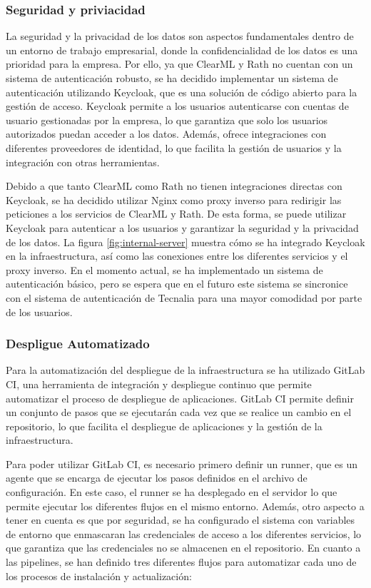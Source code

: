 \subsubsection{Seguridad y priviacidad}
La seguridad y la privacidad de los datos son aspectos fundamentales dentro
de un entorno de trabajo empresarial, donde la confidencialidad de los datos
es una prioridad para la empresa. Por ello, ya que ClearML y Rath no cuentan
con un sistema de autenticación robusto, se ha decidido implementar un sistema
de autenticación utilizando Keycloak, que es una solución de código abierto
para la gestión de acceso. Keycloak permite a los usuarios autenticarse con
cuentas de usuario gestionadas por la empresa, lo que garantiza que solo los
usuarios autorizados puedan acceder a los datos. Además, ofrece integraciones
con diferentes proveedores de identidad, lo que facilita la gestión de
usuarios y la integración con otras herramientas.\medskip

Debido a que tanto ClearML como Rath no tienen integraciones directas con
Keycloak, se ha decidido utilizar Nginx como proxy inverso para redirigir
las peticiones a los servicios de ClearML y Rath. De esta forma, se puede
utilizar Keycloak para autenticar a los usuarios y garantizar la seguridad
y la privacidad de los datos. La figura \ref{fig:internal-server} muestra
cómo se ha integrado Keycloak en la infraestructura, así como las conexiones
entre los diferentes servicios y el proxy inverso. En el momento actual, se
ha implementado un sistema de autenticación básico, pero se espera que en el
futuro este sistema se sincronice con el sistema de autenticación de Tecnalia
para una mayor comodidad por parte de los usuarios.

\subsubsection{Despligue Automatizado}
Para la automatización del despliegue de la infraestructura se ha utilizado
GitLab CI, una herramienta de integración y despliegue continuo que
permite automatizar el proceso de despliegue de aplicaciones. GitLab CI
permite definir un conjunto de pasos que se ejecutarán cada vez que se
realice un cambio en el repositorio, lo que facilita el despliegue de
aplicaciones y la gestión de la infraestructura.\medskip

Para poder utilizar GitLab CI, es necesario primero definir un runner, que
es un agente que se encarga de ejecutar los pasos definidos en el archivo
de configuración. En este caso, el runner se ha desplegado en el servidor
lo que permite ejecutar los diferentes flujos en el mismo entorno. Además,
otro aspecto a tener en cuenta es que por seguridad, se ha configurado el
sistema con variables de entorno que enmascaran las credenciales de acceso
a los diferentes servicios, lo que garantiza que las credenciales no se
almacenen en el repositorio. En cuanto a las pipelines, se han definido 
tres diferentes flujos para automatizar cada uno de los procesos de 
instalación y actualización:

